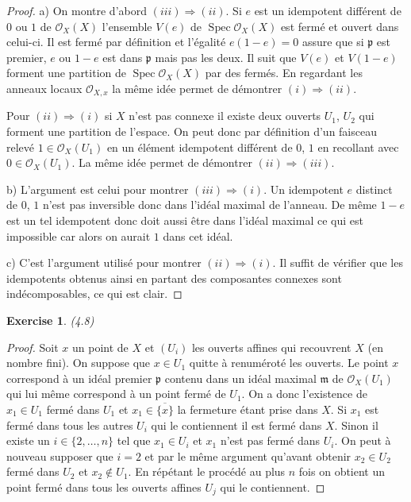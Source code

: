 \documentclass[A4, 11pt]{article}
\newtheorem{exer}{Exercise}
\def\Spec{ \operatorname{Spec}}
\begin{document}
\begin{proof}
a) On montre d'abord $(iii)\Rightarrow (ii)$. Si $e$ est un idempotent différent de $0$ ou $1$ de $\mathcal{O}_{X}(X)$ l'ensemble $V(e)$ de $\Spec \mathcal{O}_X(X)$ est fermé et ouvert dans celui-ci. Il est fermé par définition et l'égalité $e(1-e)=0$ assure que si $\mathfrak{p}$ est premier, $e$ ou $1-e$ est dans $\mathfrak{p}$ mais pas les deux. Il suit que $V(e)$ et $V(1-e)$ forment une partition de $\Spec \mathcal{O}_X(X)$ par des fermés. En regardant les anneaux locaux $\mathcal{O}_{X,x}$ la même idée permet de démontrer $(i)\Rightarrow (ii)$. 

Pour $(ii)\Rightarrow (i)$ si $X$ n'est pas connexe il existe deux ouverts $U_1$, $U_2$ qui forment une partition de l'espace. On peut donc par définition d'un faisceau relevé $1\in \mathcal{O}_X(U_1)$ en un élément idempotent différent de $0$, $1$ en recollant avec $0\in \mathcal{O}_X(U_1)$. La même idée permet de démontrer $(ii)\Rightarrow (iii)$. 

b) L'argument est celui pour montrer $(iii)\Rightarrow (i)$. Un idempotent $e$ distinct de $0$, $1$ n'est pas inversible donc dans l'idéal maximal de l'anneau. De même $1-e$ est un tel idempotent donc doit aussi être dans l'idéal maximal ce qui est impossible car alors on aurait $1$ dans cet idéal.

c) C'est l'argument utilisé pour montrer $(ii) \Rightarrow (i)$. Il suffit de vérifier que les idempotents obtenus ainsi en partant des composantes connexes sont indécomposables, ce qui est clair.

\end{proof}
\begin{exer}(4.8)
\end{exer}
\begin{proof}
Soit $x$ un point de $X$ et $(U_i)$ les ouverts affines qui recouvrent $X$ (en nombre fini). On suppose que $x\in U_1$ quitte à renuméroté les ouverts. Le point $x$ correspond à un idéal premier $\mathfrak{p}$ contenu dans un idéal maximal $\mathfrak{m}$ de $\mathcal{O}_X(U_1)$ qui lui même correspond à un point fermé de $U_1$. On a donc l'existence de $x_1\in U_1$ fermé dans $U_1$ et $x_1\in \overline{\{x\}}$ la fermeture étant prise dans $X$. Si $x_1$ est fermé dans tous les autres $U_i$ qui le contiennent il est fermé dans $X$. Sinon il existe un $i\in \{2,\dots , n\}$ tel que $x_1\in U_i$ et $x_1$ n'est pas fermé dans $U_i$. On peut à nouveau supposer que $i=2$ et par le même argument qu'avant obtenir $x_2\in U_2$ fermé dans $U_2$ et $x_2\notin U_1$. En répétant le procédé au plus $n$ fois on obtient un point fermé dans tous les ouverts affines $U_j$ qui le contiennent.
\end{proof}
\end{document}
